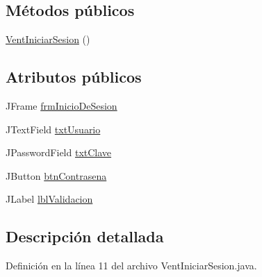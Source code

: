 \subsection*{Métodos públicos}
\begin{DoxyCompactItemize}
\item 
\hyperlink{classcom_1_1ucab_1_1javachat_1_1_cliente_1_1view_1_1_vent_iniciar_sesion_a516cd038239865f918e02a6ffc91c312}{Vent\-Iniciar\-Sesion} ()
\end{DoxyCompactItemize}
\subsection*{Atributos públicos}
\begin{DoxyCompactItemize}
\item 
J\-Frame \hyperlink{classcom_1_1ucab_1_1javachat_1_1_cliente_1_1view_1_1_vent_iniciar_sesion_ae856c96e708fb56f72bc9cbc5d7fa2e6}{frm\-Inicio\-De\-Sesion}
\item 
J\-Text\-Field \hyperlink{classcom_1_1ucab_1_1javachat_1_1_cliente_1_1view_1_1_vent_iniciar_sesion_a6605fb227c982704cea8d29e26209d95}{txt\-Usuario}
\item 
J\-Password\-Field \hyperlink{classcom_1_1ucab_1_1javachat_1_1_cliente_1_1view_1_1_vent_iniciar_sesion_a0f3064f6c169e2791341e6050b2d4fcb}{txt\-Clave}
\item 
J\-Button \hyperlink{classcom_1_1ucab_1_1javachat_1_1_cliente_1_1view_1_1_vent_iniciar_sesion_a342802505cebdc0cd4894a05ce9bbe00}{btn\-Contrasena}
\item 
J\-Label \hyperlink{classcom_1_1ucab_1_1javachat_1_1_cliente_1_1view_1_1_vent_iniciar_sesion_acbc2aba983ddff4636b19495fed687ad}{lbl\-Validacion}
\end{DoxyCompactItemize}


\subsection{Descripción detallada}


Definición en la línea 11 del archivo Vent\-Iniciar\-Sesion.\-java.



